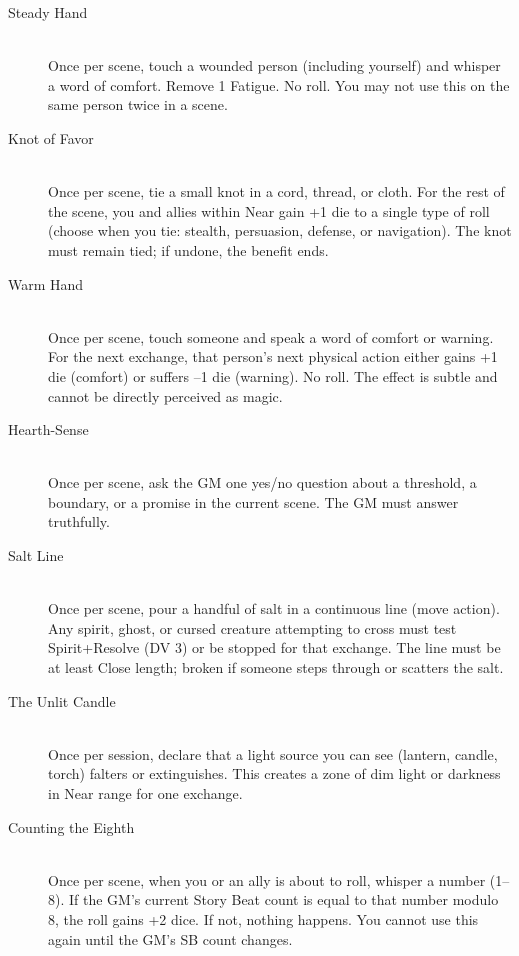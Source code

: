 \begin{description}
    \item[Steady Hand] \hfill \\
    Once per scene, touch a wounded person (including yourself) and whisper a word of comfort. Remove 1 Fatigue. No roll. You may not use this on the same person twice in a scene.

    \item[Knot of Favor] \hfill \\
    Once per scene, tie a small knot in a cord, thread, or cloth. For the rest of the scene, you and allies within Near gain +1 die to a single type of roll (choose when you tie: stealth, persuasion, defense, or navigation). The knot must remain tied; if undone, the benefit ends.

    \item[Warm Hand] \hfill \\
    Once per scene, touch someone and speak a word of comfort or warning. For the next exchange, that person's next physical action either gains +1 die (comfort) or suffers --1 die (warning). No roll. The effect is subtle and cannot be directly perceived as magic.

    \item[Hearth-Sense] \hfill \\
    Once per scene, ask the GM one yes/no question about a threshold, a boundary, or a promise in the current scene. The GM must answer truthfully.

    \item[Salt Line] \hfill \\
    Once per scene, pour a handful of salt in a continuous line (move action). Any spirit, ghost, or cursed creature attempting to cross must test Spirit+Resolve (DV 3) or be stopped for that exchange. The line must be at least Close length; broken if someone steps through or scatters the salt.

    \item[The Unlit Candle] \hfill \\
    Once per session, declare that a light source you can see (lantern, candle, torch) falters or extinguishes. This creates a zone of dim light or darkness in Near range for one exchange.

    \item[Counting the Eighth] \hfill \\
    Once per scene, when you or an ally is about to roll, whisper a number (1--8). If the GM's current Story Beat count is equal to that number modulo 8, the roll gains +2 dice. If not, nothing happens. You cannot use this again until the GM's SB count changes.
\end{description}

